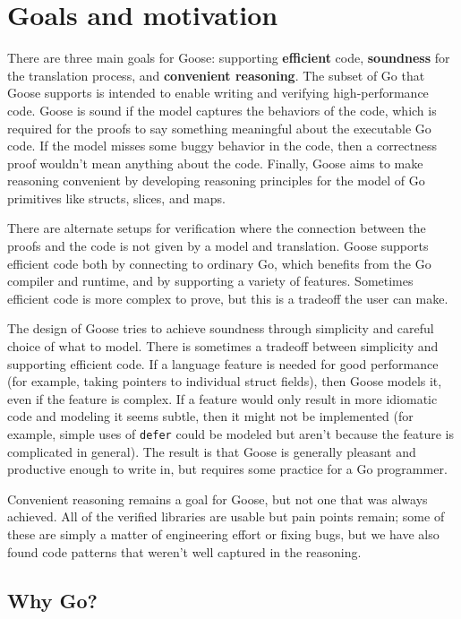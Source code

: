 \section{Goals and motivation}
\label{sec:goose:goals}

There are three main goals for Goose: supporting \textbf{efficient} code,
\textbf{soundness} for the translation process, and \textbf{convenient
reasoning}. The subset of Go that Goose supports is
intended to enable writing and verifying high-performance code. Goose
is sound if the model captures the behaviors of the code, which is required for
the proofs to say something meaningful about the executable Go code. If the model
misses some buggy behavior in the code, then a correctness proof wouldn't mean
anything about the code. Finally, Goose aims to make reasoning convenient by developing reasoning
principles for the model of Go primitives like structs, slices, and maps.

There are alternate setups for verification where the connection between the
proofs and the code is not given by a model and translation. Goose supports
efficient code both by connecting to ordinary Go, which benefits from the Go
compiler and runtime, and by supporting a variety of features. Sometimes
efficient code is more complex to prove, but this is a tradeoff the user can
make.

The
design of Goose tries to achieve soundness through simplicity and careful choice
of what to model. There is sometimes a tradeoff between simplicity and
supporting efficient code. If a language feature is needed for good performance (for
example, taking pointers to individual struct fields), then Goose models it,
even if the feature is complex. If
a feature would only result in more idiomatic code and modeling it seems
subtle, then it might not be implemented (for example, simple uses of
\texttt{defer} could be modeled but aren't because the feature is complicated in
general). The result is that Goose is generally pleasant and productive enough
to write in, but requires some practice for a Go programmer.

Convenient reasoning remains a goal for Goose, but not one that was always
achieved. All of the verified libraries are usable but pain points remain; some
of these are simply a matter of engineering effort or fixing bugs, but we have
also found code patterns that weren't well captured in the reasoning.

\subsection{Why Go?}

